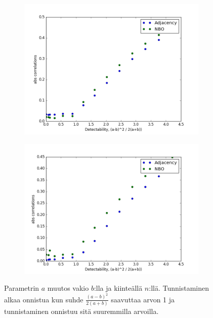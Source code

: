 \documentclass[finnish,12pt,a4paper,pdftex,sci,utf8]{aaltothesis}
\begin{document}
\begin{figure}
	\centering
	\begin{subfigure}[b]{0.45 \textwidth}
		\includegraphics[width = \textwidth]{detectability_a_1.png}
	\end{subfigure}
	\begin{subfigure}[b]{0.45 \textwidth}
		\includegraphics[width = \textwidth]{detectability_a_2.png}
	\end{subfigure}
	\caption{Parametrin $a$ muutos vakio $b$:lla ja kiinteällä $n$:llä. Tunnistaminen alkaa onnistua kun suhde $\frac{(a-b)^2}{2(a+b)}$ saavuttaa arvon 1 ja tunnistaminen onnistuu sitä suuremmilla arvoilla.}
	\label{fig:a_param}
\end{figure}
\end{document}
